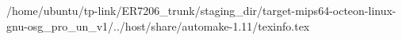 /home/ubuntu/tp-link/ER7206_trunk/staging_dir/target-mips64-octeon-linux-gnu-osg_pro_un_v1/../host/share/automake-1.11/texinfo.tex